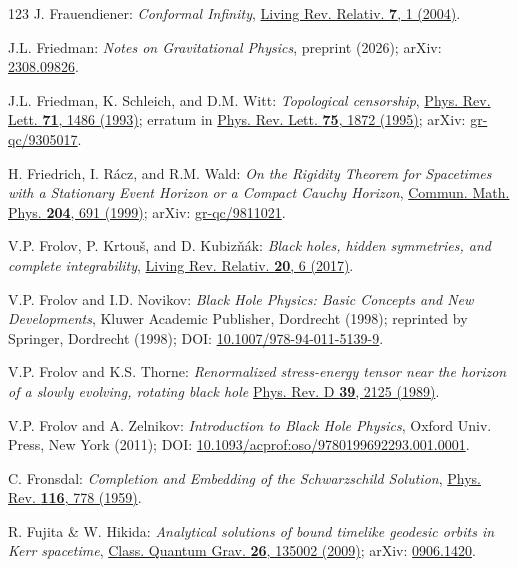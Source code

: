 \begin{thebibliography}{123}
J. Frauendiener:
{\em Conformal Infinity},
\href{https://doi.org/10.12942/lrr-2004-1}{Living Rev. Relativ. {\bf 7}, 1 (2004)}.

J.L. Friedman:
{\em Notes on Gravitational Physics}, preprint (2026);
arXiv: \href{https://arxiv.org/abs/2308.09826}{2308.09826}.

J.L. Friedman, K. Schleich, and D.M. Witt:
{\em Topological censorship},
\href{https://doi.org/10.1103/PhysRevLett.71.1486}{Phys. Rev. Lett. {\bf 71}, 1486 (1993)}; erratum in \href{https://doi.org/10.1103/PhysRevLett.75.1872}{Phys. Rev. Lett. {\bf 75}, 1872 (1995)};
arXiv: \href{https://arxiv.org/abs/gr-qc/9305017}{gr-qc/9305017}.

H. Friedrich, I. Rácz, and R.M. Wald:
{\em On the Rigidity Theorem for Spacetimes with a Stationary Event Horizon or a Compact Cauchy Horizon},
\href{https://doi.org/10.1007/s002200050662}{Commun. Math. Phys. {\bf 204}, 691 (1999)};
arXiv: \href{https://arxiv.org/abs/gr-qc/9811021}{gr-qc/9811021}.

V.P. Frolov, P. Krtouš, and D. Kubizňák:
{\em Black holes, hidden symmetries, and complete integrability},
\href{https://doi.org/10.1007/s41114-017-0009-9}{Living Rev. Relativ. {\bf 20}, 6 (2017)}.

V.P. Frolov and I.D. Novikov:
{\em Black Hole Physics: Basic Concepts and New Developments},
Kluwer Academic Publisher, Dordrecht (1998); reprinted by
Springer, Dordrecht (1998);
DOI: \href{https://doi.org/10.1007/978-94-011-5139-9}{10.1007/978-94-011-5139-9}.

V.P. Frolov and K.S. Thorne:
{\em Renormalized stress-energy tensor near the horizon of a slowly evolving, rotating black hole}
\href{https://doi.org/10.1103/PhysRevD.39.2125}{Phys. Rev. D {\bf 39}, 2125 (1989)}.

V.P. Frolov and A. Zelnikov:
{\em Introduction to Black Hole Physics},
Oxford Univ. Press, New York (2011);
DOI: \href{https://doi.org/10.1093/acprof:oso/9780199692293.001.0001}{10.1093/acprof:oso/9780199692293.001.0001}.

C. Fronsdal: {\em Completion and Embedding of the Schwarzschild Solution},
\href{https://doi.org/10.1103/PhysRev.116.778}{Phys. Rev. {\bf 116}, 778 (1959)}.

R. Fujita \& W. Hikida:
{\em Analytical solutions of bound timelike geodesic orbits in Kerr spacetime},
\href{https://doi.org/10.1088/0264-9381/26/13/135002}{Class. Quantum Grav. {\bf 26}, 135002 (2009)};
arXiv: \href{https://arxiv.org/abs/0906.1420}{0906.1420}.


\end{thebibliography}
